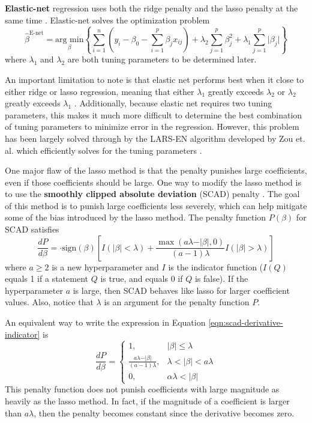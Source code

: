 \documentclass{article}
\newcommand{\argmin}[2]{\underset{#1}{\text{arg min}}\left\{#2\right\}}
\newcommand{\sign}{\text{sign}}
\begin{document}
\textbf{Elastic-net} regression uses both the ridge penalty and the lasso penalty at the same time \cite{zou2005regularization}. Elastic-net solves the optimization problem
\begin{equation}
	\hat{\beta}^{\text{E-net}}=\argmin{\beta}{\sum\limits_{i = 1}^n \left( y_i - \beta_0 - \sum\limits_{i = 1}^p \beta_j x_{ij} \right) + \lambda_2\sum\limits_{j = 1}^p \beta_j^2 + \lambda_1\sum\limits_{j = 1}^p \vert \beta_j \vert}
\end{equation}
where $\lambda_1$ and $\lambda_2$ are both tuning parameters to be determined later.

An important limitation to note is that elastic net performs best when it close to either ridge or lasso regression, meaning that either $\lambda_1$ greatly exceeds $\lambda_2$ or $\lambda_2$ greatly exceeds $\lambda_1$ \cite{zou2005regularization}. Additionally, because elastic net requires two tuning parameters, this makes it much more difficult to determine the best combination of tuning parameters to minimize error in the regression. However, this problem has been largely solved through by the LARS-EN algorithm developed by Zou et. al. which efficiently solves for the tuning parameters \cite{zou2005regularization}.

One major flaw of the lasso method is that the penalty punishes large coefficients, even if those coefficients should be large. One way to modify the lasso method is to use the \textbf{smoothly clipped absolute deviation} (SCAD) penalty \cite{fan2001variable}. The goal of this method is to punish large coefficients less severely, which can help mitigate some of the bias introduced by the lasso method. The penalty function $P(\beta)$ for SCAD satisfies
\begin{equation}\label{eqn:scad-derivative-indicator}
	\frac{dP}{d\beta} = \cdot\sign(\beta)\left[ I(\vert \beta \vert<\lambda) + \frac{\max(a\lambda - \vert \beta\vert, 0)}{(a - 1)\lambda}I(\vert \beta \vert > \lambda) \right]
\end{equation}
where $a\geq 2$ is a new hyperparameter and $I$ is the indicator function ($I(Q)$ equals 1 if a statement $Q$ is true, and equals 0 if $Q$ is false). If the hyperparameter $a$ is large, then SCAD behaves like lasso for larger coefficient values. Also, notice that $\lambda$ is an argument for the penalty function $P$.

An equivalent way to write the expression in Equation \ref{eqn:scad-derivative-indicator} is
\begin{equation}
	\frac{dP}{d\beta} = \left\{\begin{array}{ll}
		1,&\vert \beta \vert\leq \lambda\\
		\frac{a\lambda - \vert \beta \vert}{(a - 1)\lambda},&\lambda < \vert \beta \vert < a\lambda\\
		0,&\alpha\lambda < \vert \beta \vert
	\end{array}\right.
\end{equation}
This penalty function does not punish coefficients with large magnitude as heavily as the lasso method. In fact, if the magnitude of a coefficient is larger than $a\lambda$, then the penalty becomes constant since the derivative becomes zero.
\end{document}
